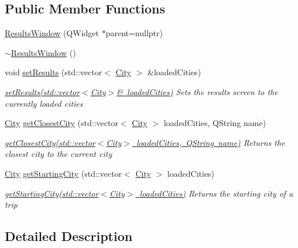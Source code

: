 \subsection*{Public Member Functions}
\begin{DoxyCompactItemize}
\item 
\mbox{\hyperlink{class_results_window_ab5eed3b399c8a305f588d4a98fb3a9ed}{Results\+Window}} (Q\+Widget $\ast$parent=nullptr)
\item 
\mbox{\hyperlink{class_results_window_a2b320802242dbf6ac6b779480a30b86c}{$\sim$\+Results\+Window}} ()
\item 
void \mbox{\hyperlink{class_results_window_ada6aa2afee19356d33b6b59646366cc2}{set\+Results}} (std\+::vector$<$ \mbox{\hyperlink{class_city}{City}} $>$ \&loaded\+Cities)
\begin{DoxyCompactList}\small\item\em \mbox{\hyperlink{class_results_window_ada6aa2afee19356d33b6b59646366cc2}{set\+Results(std\+::vector$<$\+City$>$\& loaded\+Cities)}} Sets the results screen to the currently loaded cities \end{DoxyCompactList}\item 
\mbox{\hyperlink{class_city}{City}} \mbox{\hyperlink{class_results_window_ad58645a2626daa51d8e824d56df7145f}{get\+Closest\+City}} (std\+::vector$<$ \mbox{\hyperlink{class_city}{City}} $>$ loaded\+Cities, Q\+String name)
\begin{DoxyCompactList}\small\item\em \mbox{\hyperlink{class_results_window_ad58645a2626daa51d8e824d56df7145f}{get\+Closest\+City(std\+::vector$<$\+City$>$ loaded\+Cities, Q\+String name)}} Returns the closest city to the current city \end{DoxyCompactList}\item 
\mbox{\hyperlink{class_city}{City}} \mbox{\hyperlink{class_results_window_ae9d02be8b007fcbc61f6d6536ba1520f}{get\+Starting\+City}} (std\+::vector$<$ \mbox{\hyperlink{class_city}{City}} $>$ loaded\+Cities)
\begin{DoxyCompactList}\small\item\em \mbox{\hyperlink{class_results_window_ae9d02be8b007fcbc61f6d6536ba1520f}{get\+Starting\+City(std\+::vector$<$\+City$>$ loaded\+Cities)}} Returns the starting city of a trip \end{DoxyCompactList}\end{DoxyCompactItemize}


\subsection{Detailed Description}


